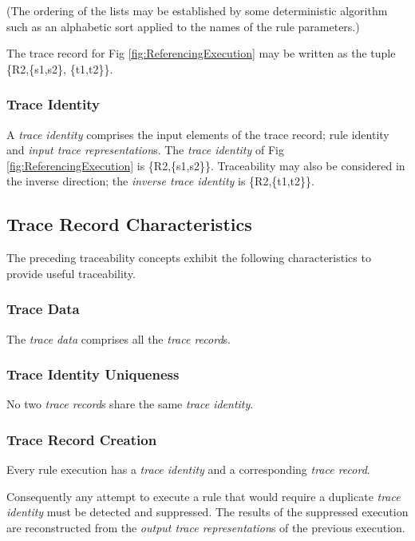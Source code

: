 \documentclass[runningheads,a4paper]{llncs}
\begin{document}
(The ordering of the lists may be established by some deterministic algorithm such as an alphabetic sort applied to the names of the rule parameters.)

The trace record for Fig \ref{fig:ReferencingExecution} may be written as the tuple \{R2,\{s1,s2\}, \{t1,t2\}\}.

\subsubsection{Trace Identity}

A \emph{trace identity} comprises the input elements of the trace record; rule identity and \emph{input trace representation}s. The \emph{trace identity} of Fig \ref{fig:ReferencingExecution} is  \{R2,\{s1,s2\}\}. Traceability may also be considered in the inverse direction; the \emph{inverse trace identity} is  \{R2,\{t1,t2\}\}.

\subsection{Trace Record Characteristics}

The preceding traceability concepts exhibit the following characteristics to provide useful traceability.

\subsubsection{Trace Data}

The \emph{trace data} comprises all the \emph{trace record}s.

\subsubsection{Trace Identity Uniqueness}

No two \emph{trace record}s share the same \emph{trace identity}.

\subsubsection{Trace Record Creation}

Every rule execution has a \emph{trace identity} and a corresponding \emph{trace record}.

Consequently any attempt to execute a rule that would require a duplicate \emph{trace identity} must be detected and suppressed. The results  of the suppressed execution are reconstructed from the \emph{output trace representation}s of the previous execution.
\end{document}
